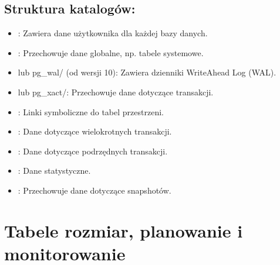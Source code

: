 \documentclass[letterpaper,10pt,polish]{sphinxmanual}
\begin{document}
\section{Struktura katalogów:}
\label{\detokenize{DB-Konfiguracja-bazy-danych/source/rozdzialy/rozdzial1:struktura-katalogow}}\begin{itemize}
\item {} 
\sphinxAtStartPar
{}: Zawiera dane użytkownika dla każdej bazy danych.

\item {} 
\sphinxAtStartPar
{}: Przechowuje dane globalne, np. tabele systemowe.

\item {} 
\sphinxAtStartPar
{} lub pg\_wal/ (od wersji 10): Zawiera dzienniki Write\sphinxhyphen{}Ahead Log (WAL).

\item {} 
\sphinxAtStartPar
{} lub pg\_xact/: Przechowuje dane dotyczące transakcji.

\item {} 
\sphinxAtStartPar
{}: Linki symboliczne do tabel przestrzeni.

\item {} 
\sphinxAtStartPar
{}: Dane dotyczące wielokrotnych transakcji.

\item {} 
\sphinxAtStartPar
{}: Dane dotyczące podrzędnych transakcji.

\item {} 
\sphinxAtStartPar
{}: Dane statystyczne.

\item {} 
\sphinxAtStartPar
{}: Przechowuje dane dotyczące snapshotów.

\end{itemize}

\sphinxstepscope


\chapter{Tabele \sphinxhyphen{} rozmiar, planowanie i monitorowanie}
\label{\detokenize{DB-Konfiguracja-bazy-danych/source/rozdzialy/rozdzial2:tabele-rozmiar-planowanie-i-monitorowanie}}\label{\detokenize{DB-Konfiguracja-bazy-danych/source/rozdzialy/rozdzial2::doc}}
\end{document}
